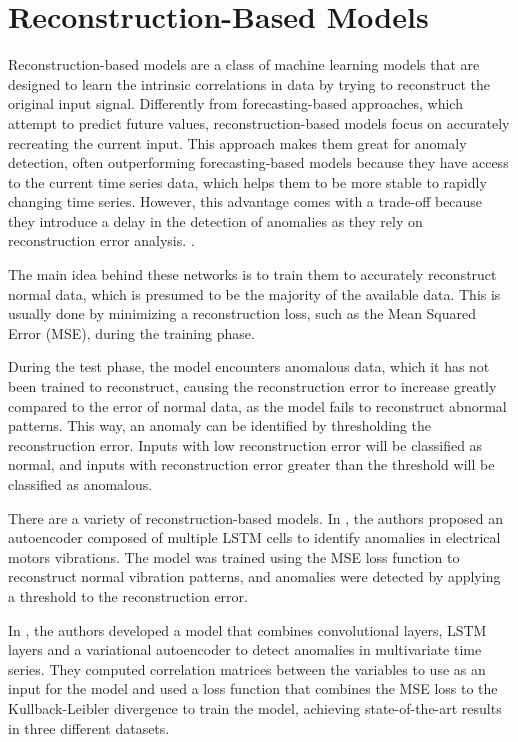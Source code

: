 \section{Reconstruction-Based Models}

Reconstruction-based models are a class of machine learning models that are designed to learn the intrinsic correlations in data by trying to reconstruct the original input signal. Differently from forecasting-based approaches, which attempt to predict future values, reconstruction-based models focus on accurately recreating the current input. This approach makes them great for anomaly detection, often outperforming forecasting-based models because they have access to the current time series data, which helps them to be more stable to rapidly changing time series. However, this advantage comes with a trade-off because they introduce a delay in the detection of anomalies as they rely on reconstruction error analysis. \cite{Zamanzadeh_Darban_Webb_Pan_Aggarwal_Salehi_2024}. 

The main idea behind these networks is to train them to accurately reconstruct normal data, which is presumed to be the majority of the available data. This is usually done by minimizing a reconstruction loss, such as the Mean Squared Error (MSE), during the training phase. 

During the test phase, the model encounters anomalous data, which it has not been trained to reconstruct, causing the reconstruction error to increase greatly compared to the error of normal data, as the model fails to reconstruct abnormal patterns. This way, an anomaly can be identified by thresholding the reconstruction error. Inputs with low reconstruction error will be classified as normal, and inputs with reconstruction error greater than the threshold will be classified as anomalous.

There are a variety of reconstruction-based models. In \cite{en17102340}, the authors proposed an autoencoder composed of multiple LSTM cells to identify anomalies in electrical motors vibrations. The model was trained using the MSE loss function to reconstruct normal vibration patterns, and anomalies were detected by applying a threshold to the reconstruction error.

In \cite{XIE2023120725}, the authors developed a model that combines convolutional layers, LSTM layers and a variational autoencoder to detect anomalies in multivariate time series. They computed correlation matrices between the variables to use as an input for the model and used a loss function that combines the MSE loss to the Kullback-Leibler divergence to train the model, achieving state-of-the-art results in three different datasets.


